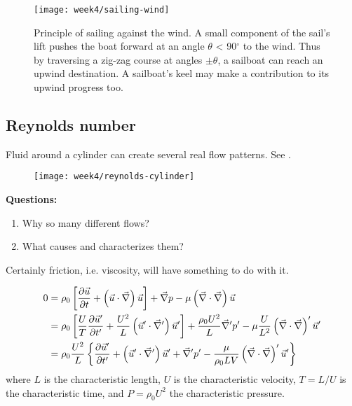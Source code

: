 \begin{figure}[!h]
    \centering
    \texttt{[image: week4/sailing-wind]}\\
    \caption{Principle of sailing against the wind. A small component of the sail’s lift pushes the boat forward at an angle $\theta$ < 90$^\circ$ to the wind. Thus by traversing a zig-zag course at angles $\pm\theta$, a sailboat can reach an upwind destination. A sailboat’s keel may make a contribution to its upwind progress too.}
    \label{fig:sailing-wind}
\end{figure}

\newpage
\subsection{Reynolds number}
Fluid around a cylinder can create several real flow patterns. See .

\begin{figure}[p]
    \centering
    \texttt{[image: week4/reynolds-cylinder]}\\
    \caption{}
    \label{fig:reynolds-cylinder}
\end{figure}

\textbf{Questions:}
\begin{enumerate}
\item Why so many different flows?
\item What causes and characterizes them?
\end{enumerate}
Certainly friction, i.e. viscosity, will have something to do with it.

\begin{align}
0 &= \rho_0 \left[\frac{\partial \vec{u}}{\partial t}+\left(\vec{u}\cdot\vec{\nabla}\right)\vec{u}\right] + \vec{\nabla}p - \mu \left(\vec{\nabla}\cdot\vec{\nabla}\right) \vec{u} \\
&= \rho_0\left[\frac{U}{T}\frac{\partial \vec{u}'}{\partial t'}+\frac{U^2}{L}\left(\vec{u}'\cdot\vec{\nabla}'\right)\vec{u}'\right] + \frac{\rho_0 U^2}{L}\vec{\nabla}'p'-\mu\frac{U}{L^2}\left(\vec{\nabla}\cdot\vec{\nabla}\right)'\vec{u}' \\
&= \rho_0\frac{U^2}{L} \left\lbrace \frac{\partial \vec{u}'}{\partial t'}+\left(\vec{u}'\cdot\vec{\nabla}'\right)\vec{u}'+\vec{\nabla}'p'-\frac{\mu}{\rho_0 LV} \left(\vec{\nabla}\cdot\vec{\nabla}\right)'\vec{u}' \right\rbrace
\end{align}
where $L$ is the characteristic length, $U$ is the characteristic velocity, $T=L/U$ is the characteristic time, and $P=\rho_0U^2$ the characteristic pressure.

